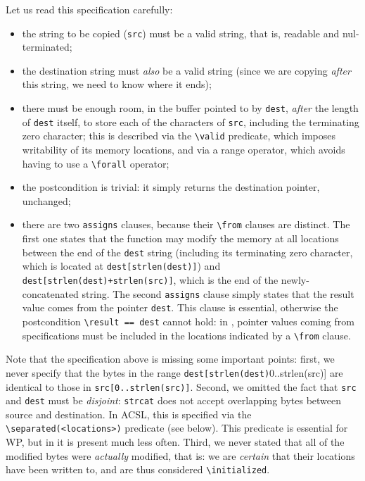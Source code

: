 \documentclass{frama-c-book}
\begin{document}
Let us read this specification carefully:

\begin{itemize}
\item the string to be copied (\texttt{src}) must be a valid string,
  that is, readable and nul-terminated;
\item the destination string must {\em also} be a valid string
  (since we are copying {\em after} this string, we need to know where it ends);
\item there must be enough room, in the buffer pointed to by \texttt{dest},
  {\em after} the length of \texttt{dest} itself, to store each of the characters
  of \texttt{src}, including the terminating zero character;
  this is described via the \verb+\valid+ predicate,
  which imposes writability of its memory locations, and via a range operator,
  which avoids having to use a \verb+\forall+ operator;
\item the postcondition is trivial: it simply returns the destination pointer,
  unchanged;
\item there are two \texttt{assigns} clauses, because their \verb+\from+
  clauses are distinct. The first one states that the function may modify the
  memory at all locations between the end of the \texttt{dest} string
  (including its terminating zero character, which is located at
  \verb+dest[strlen(dest)]+) and \verb|dest[strlen(dest)+strlen(src)]|, which
  is the end of the newly-concatenated string.
  The second \texttt{assigns} clause simply states that the result value comes
  from the pointer \texttt{dest}. This clause is essential, otherwise the
  postcondition \verb+\result == dest+ cannot hold: in \Eva{}, pointer values
  coming from specifications must be included in the locations indicated by
  a \verb+\from+ clause.
\end{itemize}

Note that the specification above is missing some important points: first, we
never specify that the bytes in the range
\verb+dest[strlen(dest)+0..strlen(src)] are identical to those in
  \verb+src[0..strlen(src)]+. Second, we omitted the fact that \texttt{src}
  and \texttt{dest} must be {\em disjoint}: \texttt{strcat} does not accept
  overlapping bytes between source and destination. In ACSL, this is specified
  via the \verb+\separated(<locations>)+ predicate (see below). This predicate is essential
  for WP, but in \Eva{} it is present much less often.
  Third, we never stated that all of the modified bytes were {\em actually}
  modified, that is: we are {\em certain} that their locations have been
  written to, and are thus considered \verb+\initialized+.
\end{document}
